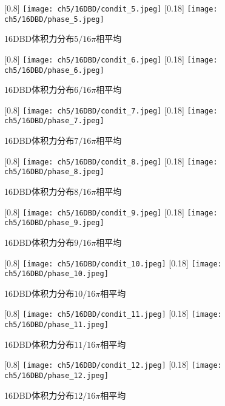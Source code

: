 \begin{figure}
  \centering
  [0.8\textwidth]
    {\texttt{[image: ch5/16DBD/condit\_5.jpeg]}}
  [0.18\textwidth]
    {\texttt{[image: ch5/16DBD/phase\_5.jpeg]}}
  \caption{16DBD体积力分布$5/16\pi$相平均}
\end{figure}
\begin{figure}
  \centering
  [0.8\textwidth]
    {\texttt{[image: ch5/16DBD/condit\_6.jpeg]}}
  [0.18\textwidth]
    {\texttt{[image: ch5/16DBD/phase\_6.jpeg]}}
  \caption{16DBD体积力分布$6/16\pi$相平均}
\end{figure}
\begin{figure}
  \centering
  [0.8\textwidth]
    {\texttt{[image: ch5/16DBD/condit\_7.jpeg]}}
  [0.18\textwidth]
    {\texttt{[image: ch5/16DBD/phase\_7.jpeg]}}
  \caption{16DBD体积力分布$7/16\pi$相平均}
\end{figure}
\begin{figure}
  \centering
  [0.8\textwidth]
    {\texttt{[image: ch5/16DBD/condit\_8.jpeg]}}
  [0.18\textwidth]
    {\texttt{[image: ch5/16DBD/phase\_8.jpeg]}}
  \caption{16DBD体积力分布$8/16\pi$相平均}
\end{figure}
\begin{figure}
  \centering
  [0.8\textwidth]
    {\texttt{[image: ch5/16DBD/condit\_9.jpeg]}}
  [0.18\textwidth]
    {\texttt{[image: ch5/16DBD/phase\_9.jpeg]}}
  \caption{16DBD体积力分布$9/16\pi$相平均}
\end{figure}
\begin{figure}
  \centering
  [0.8\textwidth]
    {\texttt{[image: ch5/16DBD/condit\_10.jpeg]}}
  [0.18\textwidth]
    {\texttt{[image: ch5/16DBD/phase\_10.jpeg]}}
  \caption{16DBD体积力分布$10/16\pi$相平均}
\end{figure}
\begin{figure}
  \centering
  [0.8\textwidth]
    {\texttt{[image: ch5/16DBD/condit\_11.jpeg]}}
  [0.18\textwidth]
    {\texttt{[image: ch5/16DBD/phase\_11.jpeg]}}
  \caption{16DBD体积力分布$11/16\pi$相平均}
\end{figure}
\begin{figure}
  \centering
  [0.8\textwidth]
    {\texttt{[image: ch5/16DBD/condit\_12.jpeg]}}
  [0.18\textwidth]
    {\texttt{[image: ch5/16DBD/phase\_12.jpeg]}}
  \caption{16DBD体积力分布$12/16\pi$相平均}
\end{figure}
